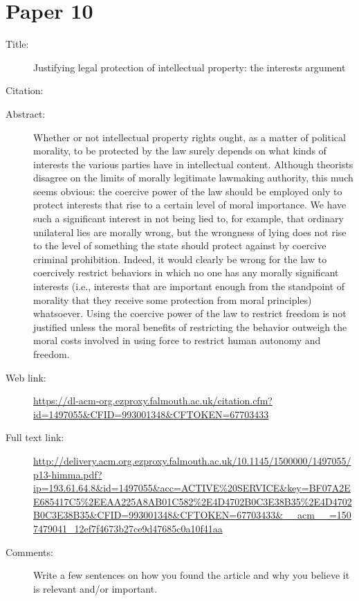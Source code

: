 \documentclass{scrartcl}
\begin{document}
\section*{Paper 10}
\begin{description}
\item[Title:] Justifying legal protection of intellectual property: the interests argument
\item[Citation:] \cite{LegalProtection}
\item[Abstract:] Whether or not intellectual property rights ought, as a matter of political morality, to be protected by the law surely depends on what kinds of interests the various parties have in intellectual content. Although theorists disagree on the limits of morally legitimate lawmaking authority, this much seems obvious: the coercive power of the law should be employed only to protect interests that rise to a certain level of moral importance. We have such a significant interest in not being lied to, for example, that ordinary unilateral lies are morally wrong, but the wrongness of lying does not rise to the level of something the state should protect against by coercive criminal prohibition. Indeed, it would clearly be wrong for the law to coercively restrict behaviors in which no one has any morally significant interests (i.e., interests that are important enough from the standpoint of morality that they receive some protection from moral principles) whatsoever. Using the coercive power of the law to restrict freedom is not justified unless the moral benefits of restricting the behavior outweigh the moral costs involved in using force to restrict human autonomy and freedom.
\item[Web link:] \url{https://dl-acm-org.ezproxy.falmouth.ac.uk/citation.cfm?id=1497055&CFID=993001348&CFTOKEN=67703433}
\item[Full text link:] \url{http://delivery.acm.org.ezproxy.falmouth.ac.uk/10.1145/1500000/1497055/p13-himma.pdf?ip=193.61.64.8&id=1497055&acc=ACTIVE%20SERVICE&key=BF07A2EE685417C5%2EEAA225A8AB01C582%2E4D4702B0C3E38B35%2E4D4702B0C3E38B35&CFID=993001348&CFTOKEN=67703433&__acm__=1507479041_12ef7f4673b27ce9d47685c0a10f41aa}
\item[Comments:] Write a few sentences on how you found the article and why you believe it is relevant and/or important.
\end{description}
\end{document}
